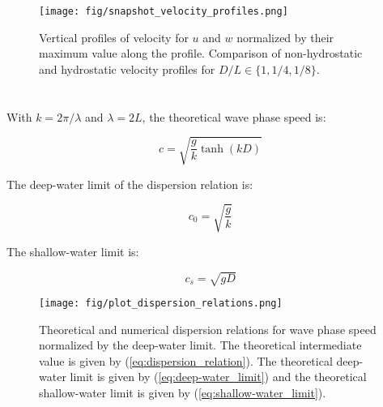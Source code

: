 \documentclass[12pt]{article}
\begin{document}
	\begin{figure}[htb]
		\begin{center}
			\texttt{[image: fig/snapshot\_velocity\_profiles.png]}
			\caption{Vertical profiles of velocity for $u$ and $w$ normalized by their maximum value along the profile. Comparison of non-hydrostatic and hydrostatic velocity profiles for $D/L \in \{1, 1/4, 1/8\}$.}
			\label{fig:snapshot_velocity_profiles}
		\end{center}
	\end{figure}

\section{}

With $k = 2\pi/\lambda$ and $\lambda = 2L$, the theoretical wave phase speed is:

\begin{equation} \label{eq:dispersion_relation}
c = \sqrt{\frac{g}{k} \tanh(kD)}
\end{equation}

The deep-water limit of the dispersion relation is:

\begin{equation} \label{eq:deep-water_limit}
c_0 = \sqrt{\frac{g}{k}}
\end{equation}

The shallow-water limit is:

\begin{equation} \label{eq:shallow-water_limit}
c_s = \sqrt{gD}
\end{equation}

	\begin{figure}[htb]
		\begin{center}
			\texttt{[image: fig/plot\_dispersion\_relations.png]}
			\caption{Theoretical and numerical dispersion relations for wave phase speed normalized by the deep-water limit. The theoretical intermediate value is given by (\ref{eq:dispersion_relation}). The theoretical deep-water limit is given by (\ref{eq:deep-water_limit}) and the theoretical shallow-water limit is given by (\ref{eq:shallow-water_limit}).}
			\label{fig:plot_dispersion_relations}
		\end{center}
	\end{figure}

\section{}
\end{document}
